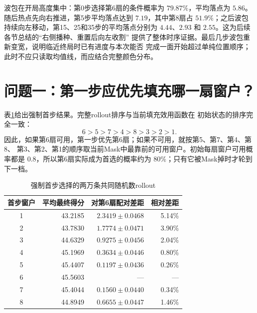 \documentclass[UTF8,11pt,openany]{ctexrep}
\begin{document}
波包在开局高度集中：第0步选择第6扇的条件概率为 $79.87\%$，平均落点为
$5.86$。随后热点先向右推进，第5步平均落点达到 $7.19$，其中第8扇占
$51.9\%$；之后波包持续向左移动，第15、25和35步的平均落点分别为
$4.44$、$2.93$ 和 $2.55$。这为后续各节总结的“右侧播种、重置后向左收割”
提供了整体时序证据。最后几步波包重新变宽，说明临近终局时已有进度与本次能否
完成一面开始超过单纯位置顺序；此时不应只读取均值线，而应结合完整颜色分布。

\section{问题一：第一步应优先填充哪一扇窗户？}

表\ref{tab:opening-insight}给出强制首步结果。完整rollout排序与当前填充效用函数在
初始状态的排序完全一致：
\[
6>5>7>4>8>3>2>1.
\]
因此，如果第6扇可用，第一步优先第6扇；如果不可用，就按第5、第7、第4、第8、
第3、第2、第1的顺序取当前Mask中最靠前的可用窗户。初始每扇窗户可用概率都是
$0.8$，所以第6扇实际成为首选的概率约为 $80\%$；只有它被Mask掉时才轮到下一档。

\begin{table}[htbp]
\centering
\caption{强制首步选择的两万条共同随机数rollout}
\label{tab:opening-insight}
\begin{tabular}{crrr}
\toprule
首步窗户 & 平均最终得分 & 对第6扇配对差距 & 相对差距 \\
\midrule
1 & 43.2185 & $2.3419\pm0.0468$ & 5.14\% \\
2 & 43.7830 & $1.7774\pm0.0471$ & 3.90\% \\
3 & 44.6329 & $0.9275\pm0.0456$ & 2.04\% \\
4 & 45.1969 & $0.3634\pm0.0446$ & 0.80\% \\
5 & 45.4407 & $0.1197\pm0.0436$ & 0.26\% \\
6 & 45.5603 & --- & --- \\
7 & 45.4044 & $0.1560\pm0.0440$ & 0.34\% \\
8 & 44.8949 & $0.6655\pm0.0447$ & 1.46\% \\
\bottomrule
\end{tabular}
\end{table}
\end{document}
